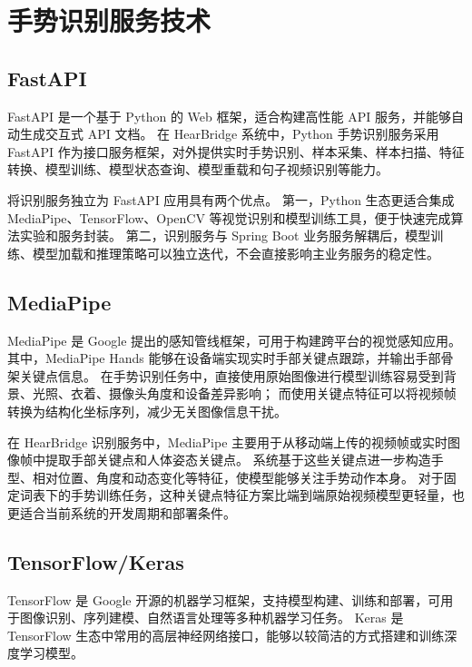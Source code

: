 
\section{手势识别服务技术}

\subsection{FastAPI}

FastAPI 是一个基于 Python 的 Web 框架，适合构建高性能 API 服务，并能够自动生成交互式 API 文档\cite{fastapi-docs}。
在 HearBridge 系统中，Python 手势识别服务采用 FastAPI 作为接口服务框架，对外提供实时手势识别、样本采集、样本扫描、特征转换、模型训练、模型状态查询、模型重载和句子视频识别等能力。

将识别服务独立为 FastAPI 应用具有两个优点。
第一，Python 生态更适合集成 MediaPipe、TensorFlow、OpenCV 等视觉识别和模型训练工具，便于快速完成算法实验和服务封装。
第二，识别服务与 Spring Boot 业务服务解耦后，模型训练、模型加载和推理策略可以独立迭代，不会直接影响主业务服务的稳定性。

\subsection{MediaPipe}

MediaPipe 是 Google 提出的感知管线框架，可用于构建跨平台的视觉感知应用\cite{lugaresi-mediapipe-2019}。
其中，MediaPipe Hands 能够在设备端实现实时手部关键点跟踪，并输出手部骨架关键点信息\cite{zhang-mediapipe-hands-2020}。
在手势识别任务中，直接使用原始图像进行模型训练容易受到背景、光照、衣着、摄像头角度和设备差异影响；
而使用关键点特征可以将视频帧转换为结构化坐标序列，减少无关图像信息干扰。

在 HearBridge 识别服务中，MediaPipe 主要用于从移动端上传的视频帧或实时图像帧中提取手部关键点和人体姿态关键点。
系统基于这些关键点进一步构造手型、相对位置、角度和动态变化等特征，使模型能够关注手势动作本身。
对于固定词表下的手势训练任务，这种关键点特征方案比端到端原始视频模型更轻量，也更适合当前系统的开发周期和部署条件。

\subsection{TensorFlow/Keras}

TensorFlow 是 Google 开源的机器学习框架，支持模型构建、训练和部署，可用于图像识别、序列建模、自然语言处理等多种机器学习任务\cite{tensorflow-docs}。
Keras 是 TensorFlow 生态中常用的高层神经网络接口，能够以较简洁的方式搭建和训练深度学习模型。

